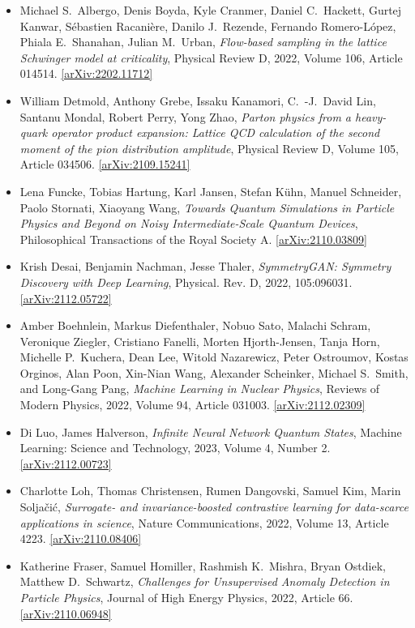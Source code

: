 \begin{itemize}
\item Michael S.\  Albergo, Denis Boyda, Kyle Cranmer, Daniel C.\  Hackett, Gurtej Kanwar, Sébastien Racanière, Danilo J.\  Rezende, Fernando Romero-López, Phiala E.\  Shanahan, Julian M.\  Urban, \textit{Flow-based sampling in the lattice Schwinger model at criticality}, Physical Review D, 2022, Volume 106, Article 014514. \href{https://arxiv.org/abs/2202.11712}{[arXiv:2202.11712]} 
\item William Detmold, Anthony Grebe, Issaku Kanamori, C.\ -J.\  David Lin, Santanu Mondal, Robert Perry, Yong Zhao, \textit{Parton physics from a heavy-quark operator product expansion: Lattice QCD calculation of the second moment of the pion distribution amplitude}, Physical Review D, Volume 105, Article 034506. \href{https://arxiv.org/abs/2109.15241}{[arXiv:2109.15241]} 
\item Lena Funcke, Tobias Hartung, Karl Jansen, Stefan Kühn, Manuel Schneider, Paolo Stornati, Xiaoyang Wang, \textit{Towards Quantum Simulations in Particle Physics and Beyond on Noisy Intermediate-Scale Quantum Devices}, Philosophical Transactions of the Royal Society A. \href{https://arxiv.org/abs/2110.03809}{[arXiv:2110.03809]} 
\item Krish Desai, Benjamin Nachman, Jesse Thaler, \textit{SymmetryGAN: Symmetry Discovery with Deep Learning}, Physical. Rev. D, 2022, 105:096031. \href{https://arxiv.org/abs/2112.05722}{[arXiv:2112.05722]} 
\item Amber Boehnlein, Markus Diefenthaler, Nobuo Sato, Malachi Schram, Veronique Ziegler, Cristiano Fanelli, Morten Hjorth-Jensen, Tanja Horn, Michelle P.\  Kuchera, Dean Lee, Witold Nazarewicz, Peter Ostroumov, Kostas Orginos, Alan Poon, Xin-Nian Wang, Alexander Scheinker, Michael S.\  Smith, and Long-Gang Pang, \textit{Machine Learning in Nuclear Physics}, Reviews of Modern Physics, 2022, Volume 94, Article 031003. \href{https://arxiv.org/abs/2112.02309}{[arXiv:2112.02309]} 
\item Di Luo, James Halverson, \textit{Infinite Neural Network Quantum States}, Machine Learning: Science and Technology, 2023, Volume 4, Number 2. \href{https://arxiv.org/abs/2112.00723}{[arXiv:2112.00723]} 
\item Charlotte Loh, Thomas Christensen, Rumen Dangovski, Samuel Kim, Marin Soljačić, \textit{Surrogate- and invariance-boosted contrastive learning for data-scarce applications in science}, Nature Communications, 2022, Volume 13, Article 4223. \href{https://arxiv.org/abs/2110.08406}{[arXiv:2110.08406]} 
\item Katherine Fraser, Samuel Homiller, Rashmish K.\  Mishra, Bryan Ostdiek, Matthew D.\  Schwartz, \textit{Challenges for Unsupervised Anomaly Detection in Particle Physics}, Journal of High Energy Physics, 2022, Article 66. \href{https://arxiv.org/abs/2110.06948}{[arXiv:2110.06948]} 

\end{itemize}
